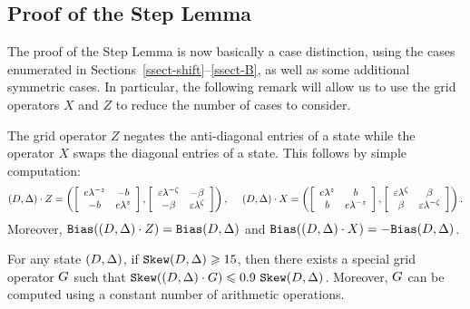 \subsection{Proof of the Step Lemma}
\label{ssect-step}

The proof of the Step Lemma is now basically a case distinction, using
the cases enumerated in Sections~\ref{ssect-shift}--\ref{ssect-B}, as
well as some additional symmetric cases. In particular, the following
remark will allow us to use the grid operators $X$ and $Z$ to reduce
the number of cases to consider.

\begin{remark}
\label{rem-XZ}
The grid operator $Z$ negates the anti-diagonal entries
of a state while the operator $X$ swaps the diagonal entries
of a state. This follows by simple computation:
  \[
    (D,\Delta)\cdot Z = 
    \left(
      \left[
        \begin{array}{cc}
          e{\lambda^{-z}} & -b \\
          -b & e{\lambda^{z}}
        \end{array} 
      \right]
    ,
      \left[
        \begin{array}{cc}
          \varepsilon{\lambda^{-\zeta}} & -\beta \\
          -\beta & \varepsilon{\lambda^{\zeta}}
        \end{array} 
      \right]
    \right),
  ~~~~
    (D,\Delta)\cdot X = 
    \left(
      \left[
        \begin{array}{cc}
          e{\lambda^{z}} & b \\
          b & e{\lambda^{-z}}
        \end{array} 
      \right]
      ,
      \left[
        \begin{array}{cc}
          \varepsilon{\lambda^{\zeta}} & \beta \\
          \beta & \varepsilon{\lambda^{-\zeta}}
        \end{array} 
      \right]
    \right).
  \]            
  Moreover, $\mathtt{Bias} ((D,\Delta)\cdot Z) = \mathtt{Bias} (D,\Delta)$ and 
  $\mathtt{Bias} ((D,\Delta)\cdot X) = -\mathtt{Bias} (D,\Delta)$.
\end{remark}



\begin{un-lemma}
For any state $(D,\Delta)$, if $\sk\state \geq \formula{\P}$, 
then there exists a special grid operator $G$ such that 
$\sk (\state\cdot \G)\leq \formula{\Qstep} ~\sk\state$.
Moreover, $G$ can be computed using a constant number of arithmetic
operations.
\end{un-lemma}

